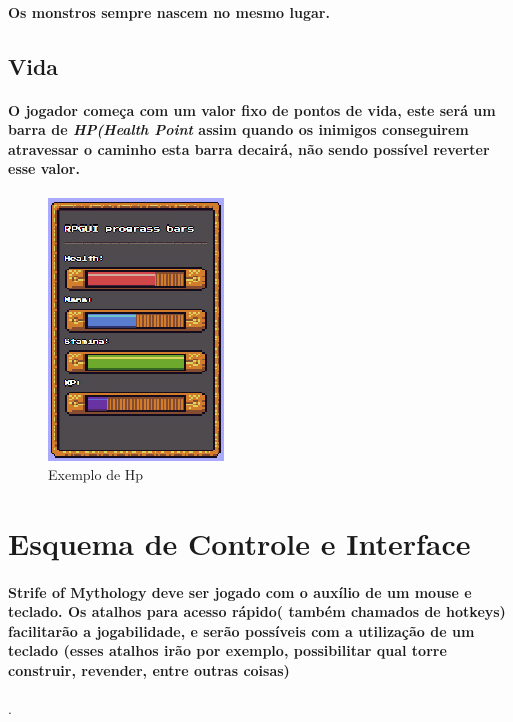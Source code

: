 \documentclass[11pt]{article} %
\begin{document}
\paragraph{Os monstros sempre nascem no mesmo lugar.}

\subsection{Vida}
\paragraph{O jogador começa com um valor fixo de pontos de vida, este será um barra de \textit{HP(Health Point} assim quando os inimigos conseguirem atravessar o caminho esta barra decairá, não sendo possível reverter esse valor.}

\begin{figure}[!htp]
\centering
\includegraphics[scale=0.3]{res/hp.png}
\caption{Exemplo de Hp}
\label{Mecânicas}
\end{figure}


\section*{Esquema de Controle e Interface}
\paragraph{Strife of Mythology deve ser jogado com o auxílio de um mouse e teclado. Os atalhos para acesso rápido( também chamados de hotkeys) facilitarão  a jogabilidade, e serão possíveis com a utilização de um teclado (esses atalhos irão por exemplo, possibilitar qual torre construir, revender, entre outras coisas)}.
\end{document}
